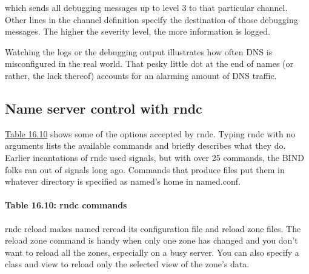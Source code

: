 
which sends all debugging messages up to level 3 to that particular
channel. Other lines in the channel definition specify the destination
of those debugging messages. The higher the severity level, the more
information is logged.

Watching the logs or the debugging output illustrates how often DNS is
misconfigured in the real world. That pesky little dot at the end of
names (or rather, the lack thereof) accounts for an alarming amount of
DNS traffic.

\protect\hypertarget{part0024_split_071.html}{}{}

\hypertarget{part0024_split_071.htmlux5cux23_idContainer1069}{}
\hypertarget{part0024_split_071.htmlux5cux23calibre_pb_70}{%
\subsection[Name server control with
{rndc}]{\texorpdfstring{\protect\hypertarget{part0024_split_071.htmlux5cux23_idTextAnchor964}{}{}\protect\hypertarget{part0024_split_071.htmlux5cux23_idIndexMarker2292}{}{}Name
server control with
{rndc}}{Name server control with rndc}}\label{part0024_split_071.htmlux5cux23calibre_pb_70}}

\protect\hyperlink{part0024_split_071.htmlux5cux23_idTextAnchor965}{Table
16.10} shows some of the options accepted by {rndc}. Typing {rndc} with
no arguments lists the available commands and briefly describes what
they do. Earlier incantations of {rndc} used signals, but with over 25
commands, the BIND folks ran out of signals long ago. Commands that
produce files put them in whatever directory is specified as {named}'s
home in {named.conf}.

\paragraph[{Table 16.10: }rndc commands]{\texorpdfstring{{Table 16.10:
}\protect\hypertarget{part0024_split_071.htmlux5cux23_idTextAnchor965}{}{}rndc
commands}{Table 16.10: rndc commands}}


\protect\hypertarget{part0024_split_071.htmlux5cux23_idIndexMarker2293}{}{}{rndc
reload} makes {named} reread its configuration file and reload zone
files. The {reload} {zone} command is handy when only one zone has
changed and you don't want to reload all the zones, especially on a busy
server. You can also specify a {class} and {view} to reload only the
selected view of the zone's data.

